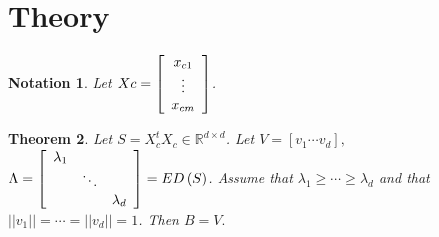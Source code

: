 \documentclass{article}%
\newtheorem{theorem}{Theorem}
\newtheorem{notation}[theorem]{Notation}
\begin{document}
\section{Theory}

\begin{notation}
Let $Xc=\left[
\begin{array}
[c]{c}%
x_{c1}\\
\vdots\\
x_{cm}%
\end{array}
\right]  $.
\end{notation}

\begin{theorem}
Let $S=X_{c}^{t}X_{c}\in\mathbb{R}^{d\times d}$. Let $V=\left[  v_{1}\cdots
v_{d}\right]  ,$ $\Lambda=\left[
\begin{array}
[c]{ccc}%
\lambda_{1} &  & \\
& \ddots & \\
&  & \lambda_{d}%
\end{array}
\right]  =ED\left(  S\right)  $. Assume that $\lambda_{1}\geq\cdots\geq
\lambda_{d}$ and that $\left\vert \left\vert v_{1}\right\vert \right\vert
=\cdots=\left\vert \left\vert v_{d}\right\vert \right\vert =1$. Then $B=V.$
\end{theorem}
\end{document}
